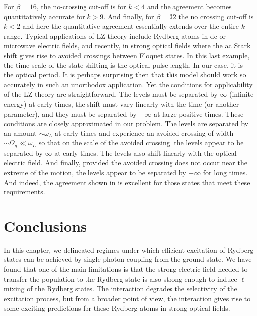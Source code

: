 For $\beta=16$, the no-crossing cut-off is for $k < 4$ and the agreement
becomes quantitatively accurate for $k > 9$.  And finally, for $\beta=32$ the
no crossing cut-off is $k < 2$ and here the quantitative agreement
essentially extends over the entire $k$ range. 
Typical applications of LZ theory include Rydberg atoms in dc or
microwave electric fields, and recently, in strong optical fields where the ac
Stark shift gives rise to avoided crossings between Floquet states.  In this
last example, the time scale of the state shifting is the optical pulse
length.  In our case, it is the optical period.  It is perhaps surprising then
that this model should work so accurately in such an unorthodox application.
Yet the conditions for applicability of the LZ theory are straightforward.  The
levels must be separated by $\infty$ (infinite energy) at early times, the shift
must vary linearly with the time (or another parameter), and
they must be separated by $-\infty$ at large positive times.  These conditions
are closely approximated in our problem.  The levels are separated by an
amount $\sim \omega_L$ at early times and experience an avoided crossing of
width $\sim \Omega_g \ll
\omega_L$ so that on the scale of the avoided crossing, the levels appear to
be separated by $\infty$ at early times.  The levels also shift linearly with
the optical electric field.  And finally, provided the avoided crossing
does not occur near the extreme of the motion, the levels appear to be
separated by $-\infty$ for long times.  And indeed, the agreement shown in
 is excellent for those states that meet these requirements.

\section{Conclusions}
\hspace{\parindent}

In this chapter, we delineated regimes under which efficient excitation of
Rydberg states can be achieved by single-photon coupling from the ground
state. We have found that one of the main limitations is that the strong
electric field needed to transfer the population to the Rydberg state is also
strong enough to induce $\ell$-mixing of the Rydberg states.  The interaction
degrades the selectivity of the excitation process, but from a broader point
of view, the interaction gives rise to some exciting predictions for these
Rydberg atoms in strong optical fields.
